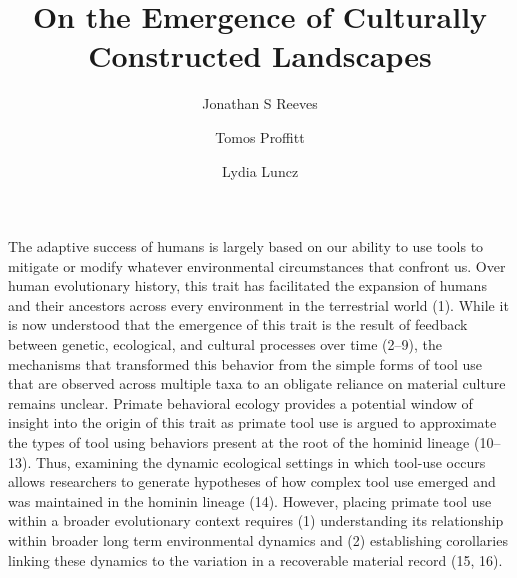 \documentclass[9pt,twocolumn,twoside,]{pnas-new}
\title{On the Emergence of Culturally Constructed Landscapes}
\author[a]{Jonathan S Reeves}
\author[a]{Tomos Proffitt}
\author[a]{Lydia Luncz}
\affil[a]{Max Planck Institute for Evolutionary Anthropology,
Technological Primate Research Group, Deutscher Platz 6., Leipzig,
Germany, 04103}
\begin{document}
\verticaladjustment{-2pt}

\maketitle
\thispagestyle{firststyle}



The adaptive success of humans is largely based on our ability to use
tools to mitigate or modify whatever environmental circumstances that
confront us. Over human evolutionary history, this trait has facilitated
the expansion of humans and their ancestors across every environment in
the terrestrial world (1). While it is now understood that the emergence
of this trait is the result of feedback between genetic, ecological, and
cultural processes over time (2--9), the mechanisms that transformed
this behavior from the simple forms of tool use that are observed across
multiple taxa to an obligate reliance on material culture remains
unclear. Primate behavioral ecology provides a potential window of
insight into the origin of this trait as primate tool use is argued to
approximate the types of tool using behaviors present at the root of the
hominid lineage (10--13). Thus, examining the dynamic ecological
settings in which tool-use occurs allows researchers to generate
hypotheses of how complex tool use emerged and was maintained in the
hominin lineage (14). However, placing primate tool use within a broader
evolutionary context requires (1) understanding its relationship within
broader long term environmental dynamics and (2) establishing
corollaries linking these dynamics to the variation in a recoverable
material record (15, 16).
\end{document}
